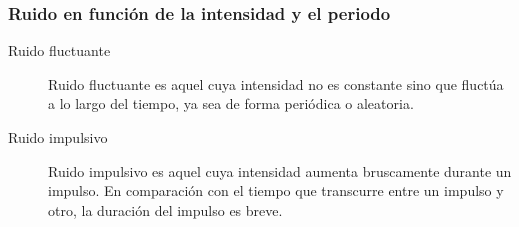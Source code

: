 \subsubsection{Ruido en función de la intensidad y el periodo}

\begin{description}

\item[Ruido fluctuante]
Ruido fluctuante es aquel cuya intensidad no es constante sino que fluctúa a lo largo del tiempo, ya sea de forma periódica o aleatoria.
\item[Ruido impulsivo]
Ruido impulsivo es aquel cuya intensidad aumenta bruscamente durante un impulso. En comparación con el tiempo que transcurre entre un impulso y otro, la duración del impulso es breve.

\end{description}
